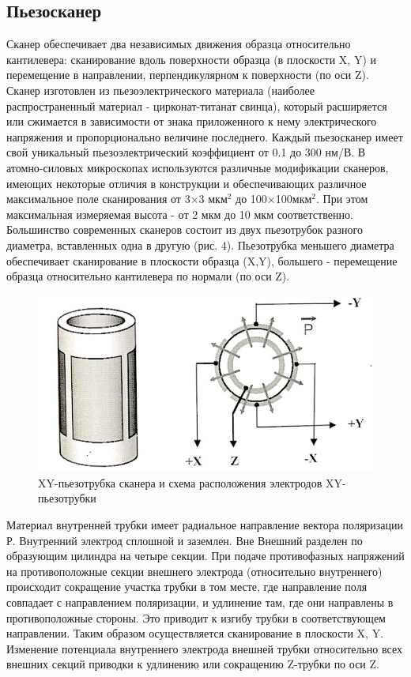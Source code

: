 \documentclass[a4paper,12pt]{article}
\theoremstyle{plain} %
\theoremstyle{definition} %
\theoremstyle{remark} %
\begin{document}
\subsection{Пьезосканер}
Сканер обеспечивает два независимых движения образца относительно кантилевера: сканирование вдоль поверхности образца (в плоскости X, Y) и перемещение в направлении, перпендикулярном к поверхности (по оси Z). Сканер изготовлен из пьезоэлектрического материала (наиболее распространенный материал - цирконат-титанат свинца), который расширяется или сжимается в зависимости от знака приложенного к нему электрического напряжения и пропорционально величине последнего. Каждый пьезосканер имеет свой уникальный пьезоэлектрический коэффициент от 0.1 до 300 нм/В. В атомно-силовых микроскопах используются различные модификации сканеров, имеющих некоторые отличия в конструкции и обеспечивающих различное максимальное поле сканирования от 3×3 $ мкм^2 $ до 100×100$  мкм^2 $. При этом максимальная измеряемая высота - от 2 мкм до 10 мкм соответственно. Большинство современных сканеров состоит из двух пьезотрубок разного диаметра, вставленных одна в другую (рис. 4). Пьезотрубка меньшего диаметра обеспечивает сканирование в плоскости образца (X,Y), большего - перемещение образца относительно кантилевера по нормали (по оси Z).
\begin{figure}[H]
	\centering
	\includegraphics[scale=0.6]{pic7.jpg}
	\caption{XY-пьезотрубка сканера и схема расположения электродов XY-пьезотрубки}
	\label{pic7}
\end{figure}
Материал внутренней трубки имеет радиальное направление вектора поляризации Р. Внутренний электрод сплошной и заземлен. Вне Внешний разделен по образующим цилиндра на четыре секции. При подаче противофазных напряжений на противоположные секции внешнего электрода (относительно внутреннего) происходит сокращение участка трубки в том месте, где направление поля совпадает с направлением поляризации, и удлинение там, где они направлены в противоположные стороны. Это приводит к изгибу трубки в соответствующем направлении. Таким образом осуществляется сканирование в плоскости X, Y. Изменение потенциала внутреннего электрода внешней трубки относительно всех внешних секций приводки к удлинению или сокращению Z-трубки по оси Z.
\end{document}
